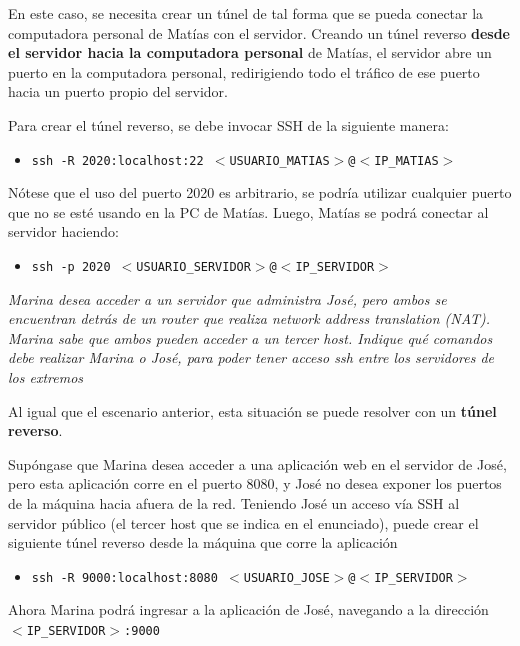 En este caso, se necesita crear un túnel de tal forma que se pueda conectar la computadora personal de Matías con el servidor. Creando un túnel reverso \textbf{desde el servidor hacia la computadora personal} de Matías, el servidor abre un puerto en la computadora personal, redirigiendo todo el tráfico de ese puerto hacia un puerto propio del servidor.

Para crear el túnel reverso, se debe invocar SSH de la siguiente manera:

\begin{itemize}
    \item \texttt{ssh -R 2020:localhost:22 $<$USUARIO\_MATIAS$>$@$<$IP\_MATIAS$>$} 
\end{itemize}

Nótese que el uso del puerto 2020 es arbitrario, se podría utilizar cualquier puerto que no se esté usando en la PC de Matías. Luego, Matías se podrá conectar al servidor haciendo:

\begin{itemize}
    \item \texttt{ssh -p 2020 $<$USUARIO\_SERVIDOR$>$@$<$IP\_SERVIDOR$>$} 
\end{itemize}


\emph{Marina desea acceder a un servidor que administra José, pero ambos se encuentran detrás de un router que realiza network address translation (NAT).  Marina sabe que ambos pueden acceder a un tercer host. Indique qué comandos debe realizar Marina o José, para poder tener acceso ssh entre los servidores de los extremos} 
\vspace*{5mm}

Al igual que el escenario anterior, esta situación se puede resolver con un \textbf{túnel reverso}. 

Supóngase que Marina desea acceder a una aplicación web en el servidor de José, pero esta aplicación corre en el puerto 8080, y José no desea exponer los puertos de la máquina hacia afuera de la red. Teniendo José un acceso vía SSH al servidor público (el tercer host que se indica en el enunciado), puede crear el siguiente túnel reverso desde la máquina que corre la aplicación

\begin{itemize}
    \item \texttt{ssh -R 9000:localhost:8080 $<$USUARIO\_JOSE$>$@$<$IP\_SERVIDOR$>$} 
\end{itemize}

Ahora Marina podrá ingresar a la aplicación de José, navegando a la dirección \texttt{$<$IP\_SERVIDOR$>$:9000} 


